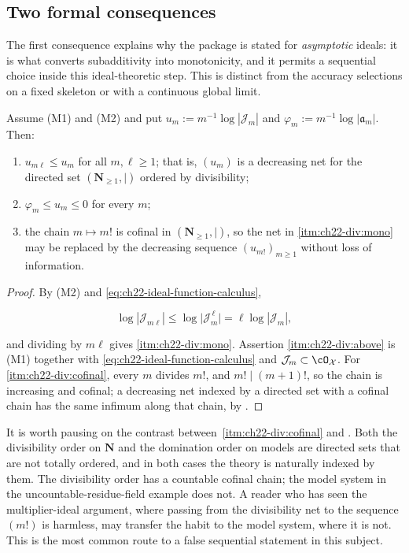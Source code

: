 \subsection{Two formal consequences}

The first consequence explains why the package is stated for
\emph{asymptotic} ideals: it is what converts subadditivity into
monotonicity, and it permits a sequential choice inside this
ideal-theoretic step.
This is distinct from the accuracy selections on a fixed skeleton or with
a continuous global limit.

\begin{lemma}
\label{lem:ch22-divisibility-net}
Assume \textup{(M1)} and \textup{(M2)} and put
$u_m:=m^{-1}\log|\mathcal J_m|$ and
$\varphi_m:=m^{-1}\log|\mathfrak a_m|$.  Then:
\begin{enumerate}
\item\label{itm:ch22-div:mono} $u_{m\ell}\leq u_m$ for all
$m,\ell\geq1$; that is, $(u_m)$ is a decreasing net for the directed set
$(\mathbf N_{\geq1},\mid)$ ordered by divisibility;
\item\label{itm:ch22-div:above} $\varphi_m\leq u_m\leq0$ for every $m$;
\item\label{itm:ch22-div:cofinal} the chain $m\mapsto m!$ is cofinal in
$(\mathbf N_{\geq1},\mid)$, so the net in
\cref{itm:ch22-div:mono} may be replaced by the decreasing sequence
$(u_{m!})_{m\geq1}$ without loss of information.
\end{enumerate}
\end{lemma}

\begin{proof}
By (M2) and \eqref{eq:ch22-ideal-function-calculus},

\[
 \log|\mathcal J_{m\ell}|\leq\log\bigl|\mathcal J_m^{\,\ell}\bigr|
 =\ell\log|\mathcal J_m| ,
\]

and dividing by $m\ell$ gives \cref{itm:ch22-div:mono}.  Assertion
\cref{itm:ch22-div:above} is (M1) together with
\eqref{eq:ch22-ideal-function-calculus} and
$\mathcal J_m\subset\cO_{\mathcal X}$.  For
\cref{itm:ch22-div:cofinal}, every $m$ divides $m!$, and
$m!\mid(m+1)!$, so the chain is increasing and cofinal; a decreasing net
indexed by a directed set with a cofinal chain has the same infimum along
that chain, by .
\end{proof}

\begin{remark}
\label{rem:ch22-two-directed-sets}
It is worth pausing on the contrast between
\,\cref{itm:ch22-div:cofinal} and
.  Both the divisibility order on
$\mathbf N$ and the domination order on models are directed sets that are
not totally ordered, and in both cases the theory is naturally indexed by
them.  The divisibility order has a countable cofinal chain; the model system
in the uncountable-residue-field example does not.  A reader who has
seen the multiplier-ideal argument, where passing from the divisibility net
to the sequence $(m!)$ is harmless, may transfer the habit to the model
system, where it is not.  This is the most common route to a false
sequential statement in this subject.
\end{remark}

